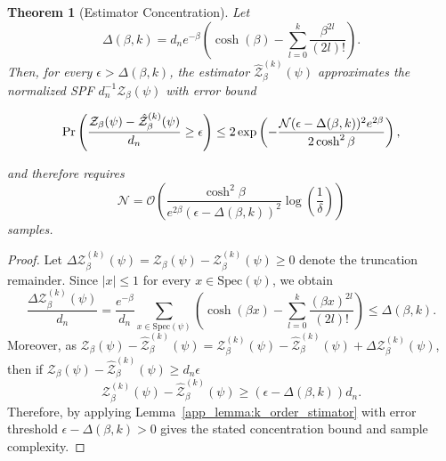 \documentclass[aps,pra,superscriptaddress,twocolumn,longbibliography]{revtex4-2}
\newtheorem{theorem}{\textbf{Theorem}}
\begin{document}
\begin{theorem}[Estimator Concentration]
Let
%
\begin{equation}
    \Delta(\beta,k)=d_{n}e^{-\beta}\left(\cosh{(\beta)}-\sum_{l=0}^{k} \frac{\beta^{2l}}{(2l)!}\right).
\end{equation}
%
Then, for every $\epsilon>\Delta(\beta,k)$, the estimator $\hat{\mathcal{Z}}^{(k)}_{\beta}(\psi)$ approximates the normalized SPF $d_n^{-1}\mathcal{Z}_{\beta}(\psi)$ with error bound

\begin{equation}
    {\rm Pr}\left(\frac{\mathcal{Z}_{\beta}(\psi)-\hat{\mathcal{Z}}^{(k)}_{\beta}(\psi)}{d_n} \geq \epsilon\right) \leq 2\exp\left(-\frac{\mathcal{N} (\epsilon-\Delta(\beta,k))^{2}e^{2\beta}}{2\cosh^{2}{\beta}}\right),
\end{equation}

and therefore requires
%
\begin{equation}
    \mathcal{N}=\mathcal{O}\left(\frac{\cosh^{2}{\beta}}{e^{2\beta}(\epsilon-\Delta(\beta,k))^{2}}\log\left(\frac{1}{\delta}\right)\right)
\end{equation}
%
samples.

\end{theorem}

\begin{proof}
    Let $\Delta \mathcal{Z}_{\beta}^{(k)}(\psi)=\mathcal{Z}_{\beta}(\psi)-\mathcal{Z}^{(k)}_{\beta}(\psi)\geq 0$ denote the truncation remainder. Since $|x|\leq 1$ for every $x \in \text{Spec}(\psi)$, we obtain
    \begin{equation}
        \frac{\Delta \mathcal{Z}_{\beta}^{(k)}(\psi)}{d_n}= \frac{e^{-\beta}}{d_n}\sum_{x \in \text{Spec}(\psi)}\left(\cosh{(\beta x)}-\sum_{l=0}^{k}\frac{(\beta x)^{2l}}{(2l)!}\right)\leq \Delta(\beta,k).
    \end{equation}
    Moreover, as $\mathcal{Z}_{\beta}(\psi)-\hat{\mathcal{Z}}^{(k)}_{\beta}(\psi)=\mathcal{Z}^{(k)}_{\beta}(\psi)-\hat{\mathcal{Z}}^{(k)}_{\beta}(\psi)+\Delta \mathcal{Z}_{\beta}^{(k)}(\psi)$, then if $ \mathcal{Z}_{\beta}(\psi)-\hat{\mathcal{Z}}^{(k)}_{\beta}(\psi)\geq d_{n} \epsilon $
    \begin{equation}
     \mathcal{Z}^{(k)}_{\beta}(\psi)-\hat{\mathcal{Z}}^{(k)}_{\beta}(\psi) \geq (\epsilon-\Delta(\beta,k))d_{n}.
    \end{equation}
    Therefore, by applying Lemma~\ref{app_lemma:k_order_stimator} with error threshold $\epsilon-\Delta(\beta,k)>0$ gives the stated concentration bound and sample complexity.
\end{proof}
\end{document}
